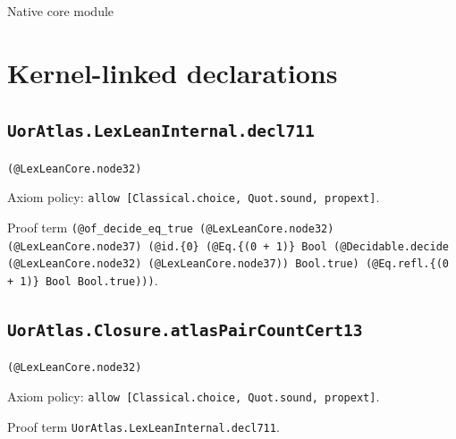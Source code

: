 \documentclass[11pt]{article}
\begin{document}
\begin{center}{\LARGE Native core module}\end{center}
\section*{Kernel-linked declarations}
\subsection*{\texttt{UorAtlas.LexLeanInternal.decl711}}
\noindent\texttt{(@LexLeanCore.node32)}\par
\noindent Axiom policy: \texttt{allow [Classical.choice, Quot.sound, propext]}.\par
\noindent Proof term \texttt{(@of\_decide\_eq\_true (@LexLeanCore.node32) (@LexLeanCore.node37) (@id.\{0\} (@Eq.\{(0 + 1)\} Bool (@Decidable.decide (@LexLeanCore.node32) (@LexLeanCore.node37)) Bool.true) (@Eq.refl.\{(0 + 1)\} Bool Bool.true)))}.\par
\subsection*{\texttt{UorAtlas.Closure.atlasPairCountCert13}}
\noindent\texttt{(@LexLeanCore.node32)}\par
\noindent Axiom policy: \texttt{allow [Classical.choice, Quot.sound, propext]}.\par
\noindent Proof term \texttt{UorAtlas.LexLeanInternal.decl711}.\par
\end{document}
